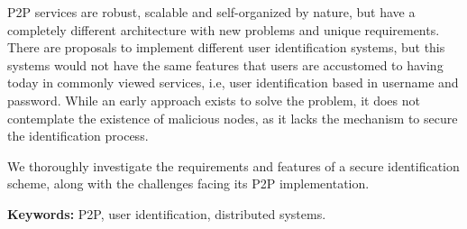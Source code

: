 

P2P services are robust, scalable and self-organized by nature, but have a
completely different architecture with new problems and unique requirements.
There are proposals to implement different user identification systems, but
this systems would not have the same features
 that users are accustomed to having today in commonly
viewed services, i.e, user identification based in username and password. While an
early approach exists to solve the problem, it does not contemplate the existence
of malicious nodes, as it lacks the mechanism to secure the identification
process.

 We thoroughly investigate the requirements and features of a secure
identification scheme, along with the challenges facing its P2P implementation.





{\bf Keywords:} P2P, user identification, distributed systems.
